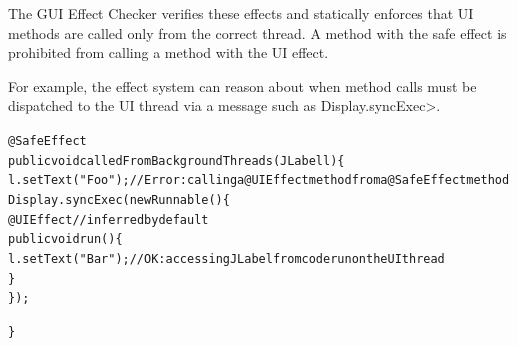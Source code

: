 
The GUI Effect Checker verifies these effects and statically enforces that UI methods are
called only from the correct thread.  A method with the safe effect is prohibited from calling a method
with the UI effect.

For example, the effect system can reason about when method calls must be dispatched to the UI
thread via a message such as \<Display.syncExec>.
\begin{alltt}
@SafeEffect
public void calledFromBackgroundThreads(JLabel l) \{
    l.setText("Foo");       // Error: calling a @UIEffect method from a @SafeEffect method
    Display.syncExec(new Runnable() \{
        @UIEffect // inferred by default
        public void run() \{
            l.setText("Bar");  // OK: accessing JLabel from code run on the UI thread
        \}
    \});

\}
\end{alltt}

